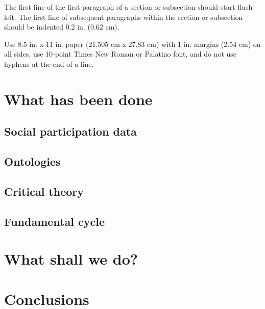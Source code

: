 \documentclass[letterpaper,10pt]{article}
\begin{document}
The first line of the first paragraph of a section or subsection should start flush left. The first line of subsequent paragraphs within the section or subsection should be indented 0.2 in. (0.62 cm).

Use 8.5 in. x 11 in. paper (21.505 cm x 27.83 cm) with 1 in. margins (2.54 cm) on all sides, use 10-point Times New Roman or Palatino font, and do not use hyphens at the end of a line. 

\section{What has been done}

\subsection{Social participation data}
\subsection{Ontologies}
\subsection{Critical theory}
\subsection{Fundamental cycle}

\section{What shall we do?}

\section{Conclusions}
\end{document}
